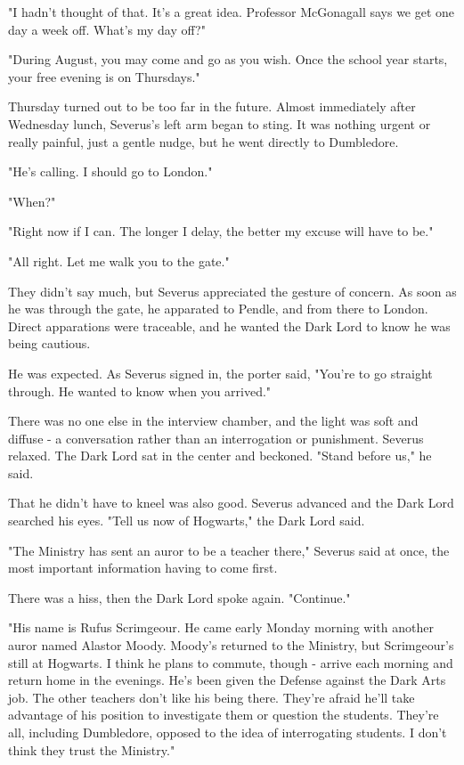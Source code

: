 "I hadn't thought of that. It's a great idea. Professor McGonagall says we get one day a week off. What's my day off?"

"During August, you may come and go as you wish. Once the school year starts, your free evening is on Thursdays."

Thursday turned out to be too far in the future. Almost immediately after Wednesday lunch, Severus's left arm began to sting. It was nothing urgent or really painful, just a gentle nudge, but he went directly to Dumbledore.

"He's calling. I should go to London."

"When?"

"Right now if I can. The longer I delay, the better my excuse will have to be."

"All right. Let me walk you to the gate."

They didn't say much, but Severus appreciated the gesture of concern. As soon as he was through the gate, he apparated to Pendle, and from there to London. Direct apparations were traceable, and he wanted the Dark Lord to know he was being cautious.

He was expected. As Severus signed in, the porter said, "You're to go straight through. He wanted to know when you arrived."

There was no one else in the interview chamber, and the light was soft and diffuse - a conversation rather than an interrogation or punishment. Severus relaxed. The Dark Lord sat in the center and beckoned. "Stand before us," he said.

That he didn't have to kneel was also good. Severus advanced and the Dark Lord searched his eyes. "Tell us now of Hogwarts," the Dark Lord said.

"The Ministry has sent an auror to be a teacher there," Severus said at once, the most important information having to come first.

There was a hiss, then the Dark Lord spoke again. "Continue."

"His name is Rufus Scrimgeour. He came early Monday morning with another auror named Alastor Moody. Moody's returned to the Ministry, but Scrimgeour's still at Hogwarts. I think he plans to commute, though - arrive each morning and return home in the evenings. He's been given the Defense against the Dark Arts job. The other teachers don't like his being there. They're afraid he'll take advantage of his position to investigate them or question the students. They're all, including Dumbledore, opposed to the idea of interrogating students. I don't think they trust the Ministry."

